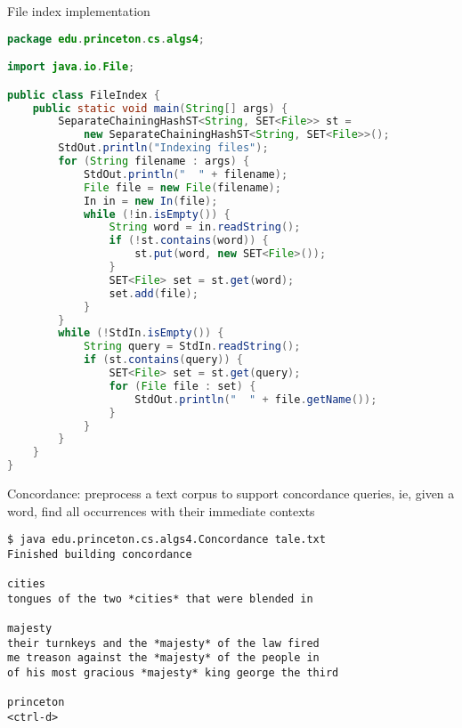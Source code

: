 \documentclass[8pt,a4paper,compress]{beamer}
\begin{document}
\begin{frame}[fragile]
File index implementation
\begin{lstlisting}[language=Java]
package edu.princeton.cs.algs4;

import java.io.File;

public class FileIndex { 
    public static void main(String[] args) {
        SeparateChainingHashST<String, SET<File>> st = 
            new SeparateChainingHashST<String, SET<File>>();
        StdOut.println("Indexing files");
        for (String filename : args) {
            StdOut.println("  " + filename);
            File file = new File(filename);
            In in = new In(file);
            while (!in.isEmpty()) {
                String word = in.readString();
                if (!st.contains(word)) { 
                    st.put(word, new SET<File>());
                }
                SET<File> set = st.get(word);
                set.add(file);
            }
        }
        while (!StdIn.isEmpty()) {
            String query = StdIn.readString();
            if (st.contains(query)) {
                SET<File> set = st.get(query);
                for (File file : set) {
                    StdOut.println("  " + file.getName());
                }
            }
        }
    }
}
\end{lstlisting}
\end{frame}

\begin{frame}[fragile]
Concordance: preprocess a text corpus to support concordance queries, ie, given a word, find all occurrences with their immediate contexts

\begin{lstlisting}[language={}]
$ java edu.princeton.cs.algs4.Concordance tale.txt
Finished building concordance

cities
tongues of the two *cities* that were blended in

majesty
their turnkeys and the *majesty* of the law fired
me treason against the *majesty* of the people in
of his most gracious *majesty* king george the third

princeton
<ctrl-d>
\end{lstlisting}
\end{frame}
\end{document}
